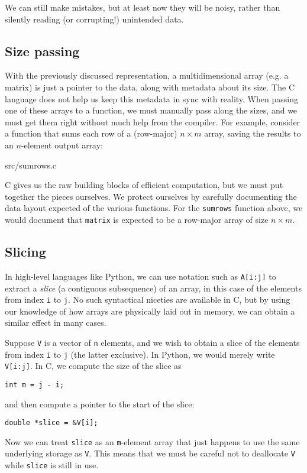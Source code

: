 We can still make mistakes, but at least now they will be noisy,
rather than silently reading (or corrupting!) unintended data.

\subsection{Size passing}
\label{sec:sizepassing}

With the previously discussed representation, a multidimensional array
(e.g. a matrix) is just a pointer to the data, along with metadata
about its size.  The C language does not help us keep this metadata in
sync with reality.  When passing one of these arrays to a function, we
must manually pass along the sizes, and we must get them right without
much help from the compiler.  For example, consider a function that
sums each row of a (row-major) $n\times{}m$ array, saving the results
to an $n$-element output array:


{src/sumrows.c}

C gives us the raw building blocks of efficient computation, but we
must put together the pieces ourselves.  We protect ourselves by
carefully documenting the data layout expected of the various
functions.  For the \texttt{sumrows} function above, we would document
that \texttt{matrix} is expected to be a row-major array of size
$n\times{}m$.

\subsection{Slicing}
\label{sec:slicing}

In high-level languages like Python, we can use notation such as
\texttt{A[i:j]} to extract a \textit{slice} (a contiguous subsequence)
of an array, in this case of the elements from index \texttt{i} to
\texttt{j}.  No such syntactical niceties are available in C, but by
using our knowledge of how arrays are physically laid out in memory,
we can obtain a similar effect in many cases.

Suppose \texttt{V} is a vector of \texttt{n} elements, and we wish to
obtain a slice of the elements from index \texttt{i} to \texttt{j}
(the latter exclusive).  In Python, we would merely write
\texttt{V[i:j]}.  In C, we compute the size of the slice as
\begin{lstlisting}
int m = j - i;
\end{lstlisting}
and then compute a pointer to the start of the slice:
\begin{lstlisting}
double *slice = &V[i];
\end{lstlisting}
Now we can treat \texttt{slice} as an \texttt{m}-element array that
just happens to use the same underlying storage as \texttt{V}.  This
means that we must be careful not to deallocate \texttt{V} while
\texttt{slice} is still in use.

